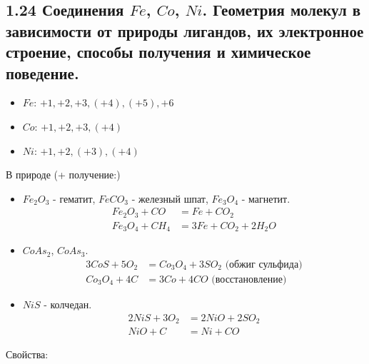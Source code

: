 
\subsection{1.24 Соединения $Fe$, $Co$, $Ni$. Геометрия молекул в зависимости от природы лигандов, их электронное строение, способы получения и химическое поведение.}
\begin{itemize}
	\item $Fe$: $+1, +2, +3, (+4), (+5), +6$	
	\item $Co$: $+1, +2, +3, (+4)$
	\item $Ni$: $+1, +2, (+3), (+4)$
\end{itemize}
В природе (+ получение:)
\begin{itemize}
	\item $Fe_2O_3$ - гематит, $FeCO_3$ - железный шпат, $Fe_3O_4$ - магнетит.
	\begin{align*}
	Fe_2O_3 + CO &= Fe + CO_2 \\
	Fe_3O_4 + CH_4 &= 3 Fe + CO_2 + 2 H_2O	
	\end{align*}
	\item $CoAs_2$, $CoAs_3$.
	\begin{align*}
	3 CoS + 5O_2 &= Co_3O_4 + 3SO_2 \text{ (обжиг сульфида)} \\
	Co_3O_4 + 4 C &= 3 Co + 4 CO \text{ (восстановление)}
	\end{align*}	
	\item $NiS$ - колчедан.
	\begin{align*}
	2 NiS + 3O_2 &= 2NiO + 2SO_2 \\
	NiO +  C &= Ni + CO 
	\end{align*}
\end{itemize}
Свойства:
